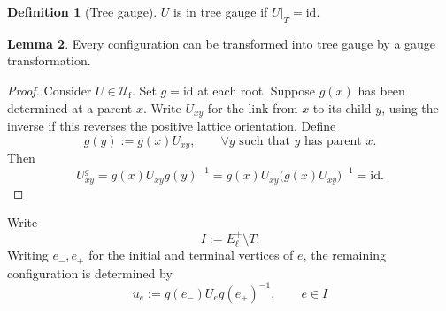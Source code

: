 \documentclass[10pt,reqno]{amsart}
\theoremstyle{definition}
\newtheorem{definition}{Definition}[section]
\newtheorem{lemma}[definition]{Lemma}
\theoremstyle{remark}
\numberwithin{equation}{section}
\numberwithin{figure}{section}
\newcommand{\id}{\mathrm{id}}
\newcommand{\Uf}{\mathcal U_{\mathrm f}}
\begin{document}
\begin{definition}[Tree gauge] $U$ is in tree gauge if $U|_T=\id$.

\end{definition}

\begin{lemma}\label{lem:tree-gauge} Every configuration can be transformed into tree gauge by a gauge transformation.\end{lemma}

\begin{proof} Consider $U\in\Uf$. Set $g=\id$ at each root.
Suppose $g(x)$ has been determined at a parent $x$. Write $U_{xy}$ for the link from $x$ to its child $y$, using the inverse if this reverses the positive lattice orientation. Define
\begin{equation}\label{eq:display-065}
g(y):=g(x)U_{xy},\qquad\forall y\text{ such that }y\text{ has parent }x.
\end{equation}
Then
\begin{equation}\label{eq:display-066}
U_{xy}^g
=g(x)U_{xy}g(y)^{-1} =g(x)U_{xy}\bigl(g(x)U_{xy}\bigr)^{-1} =\id.
\end{equation}
\end{proof}

Write
\begin{equation}\label{eq:remaining-links}
I:=E_\ell^+\setminus T.
\end{equation}
Writing $e_-,e_+$ for the initial and terminal vertices of $e$, the remaining configuration is determined by
\begin{equation}\label{eq:display-068}
u_e:=g(e_-)U_eg(e_+)^{-1},\qquad e\in I
\end{equation}
\end{document}
